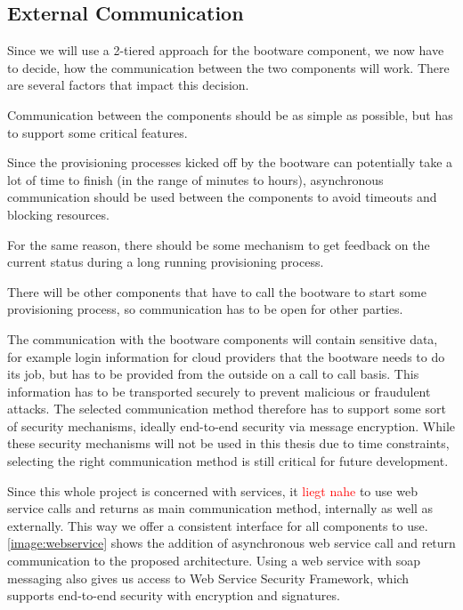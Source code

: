 \subsection{External Communication}
\label{design:communication}

Since we will use a 2-tiered approach for the bootware component, we now have to decide, how the communication between the two components will work.
There are several factors that impact this decision.

Communication between the components should be as simple as possible, but has to support some critical features.

Since the provisioning processes kicked off by the bootware can potentially take a lot of time to finish (in the range of minutes to hours), asynchronous communication should be used between the components to avoid timeouts and blocking resources.

For the same reason, there should be some mechanism to get feedback on the current status during a long running provisioning process.

There will be other components that have to call the bootware to start some provisioning process, so communication has to be open for other parties.

The communication with the bootware components will contain sensitive data, for example login information for cloud providers that the bootware needs to do its job, but has to be provided from the outside on a call to call basis.
This information has to be transported securely to prevent malicious or fraudulent attacks.
The selected communication method therefore has to support some sort of security mechanisms, ideally end-to-end security via message encryption.
While these security mechanisms will not be used in this thesis due to time constraints, selecting the right communication method is still critical for future development.

Since this whole project is concerned with services, it \textcolor{red}{liegt nahe} to use web service calls and returns as main communication method, internally as well as  externally.
This way we offer a consistent interface for all components to use.
\autoref{image:webservice} shows the addition of asynchronous web service call and return communication to the proposed architecture.
Using a web service with soap messaging also gives us access to Web Service Security Framework, which supports end-to-end security with encryption and signatures.

